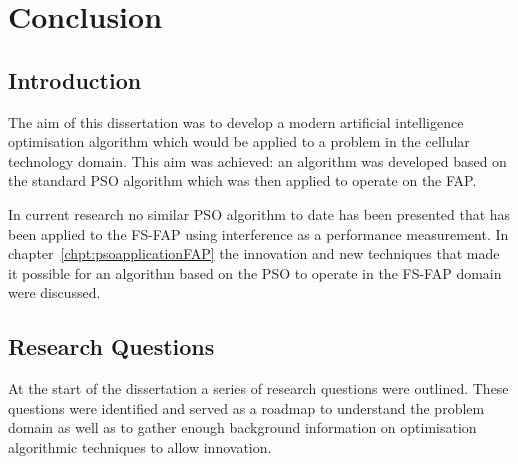 \chapter{Conclusion}
\label{chpt:conclusion}
\section{Introduction}
The aim of this dissertation was to develop a modern artificial intelligence optimisation algorithm which would be applied to a problem in the cellular technology domain. This aim was achieved: an algorithm was developed based on the standard PSO algorithm which was then applied to operate on the FAP. 

In current research no similar PSO algorithm to date has been presented that has been applied to the FS-FAP using interference as a performance measurement. In chapter~\ref{chpt:psoapplicationFAP} the innovation and new techniques that made it possible for an algorithm based on the PSO to operate in the FS-FAP domain were discussed.

\section{Research Questions}
At the start of the dissertation a series of research questions were outlined. These questions were identified and served as a roadmap to understand the problem domain as well as to gather enough background information on optimisation algorithmic techniques to allow innovation.


